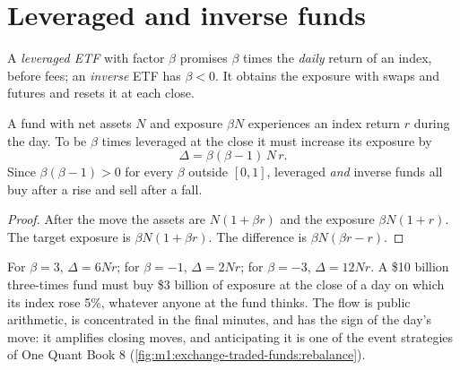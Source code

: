 \section{Leveraged and inverse funds}

\begin{definition}\label{def:m1:exchange-traded-funds:leveraged}
A \emph{leveraged ETF} with factor $\beta$ promises
$\beta$ times the \emph{daily} return of an index, before fees; an
\emph{inverse} ETF has $\beta < 0$. It obtains the exposure with swaps and
futures and resets it at each close.
\end{definition}

\begin{proposition}\label{prop:m1:exchange-traded-funds:rebalance}
A fund with net assets $N$ and exposure $\beta N$ experiences an index return
$r$ during the day. To be $\beta$ times leveraged at the close it must
increase its exposure by
\[
\Delta = \beta(\beta - 1)\,N\,r .
\]
Since $\beta(\beta-1) > 0$ for every $\beta$ outside $[0,1]$, leveraged
\emph{and} inverse funds all buy after a rise and sell after a fall.
\end{proposition}
\begin{proof}
After the move the assets are $N(1+\beta r)$ and the exposure $\beta N(1+r)$.
The target exposure is $\beta N(1+\beta r)$. The difference is $\beta N(\beta
r - r)$.
\end{proof}

\begin{example}\label{ex:m1:exchange-traded-funds:six}
For $\beta = 3$, $\Delta = 6Nr$; for $\beta = -1$, $\Delta = 2Nr$; for $\beta
= -3$, $\Delta = 12Nr$. A \$10 billion three-times fund must buy \$3 billion of
exposure at the close of a day on which its index rose 5\%, whatever anyone
at the fund thinks. The flow is public arithmetic, is concentrated in the
final minutes, and has the sign of the day's move: it amplifies closing
moves, and anticipating it is one of the event strategies of One Quant Book 8
(\cref{fig:m1:exchange-traded-funds:rebalance}).
\end{example}

